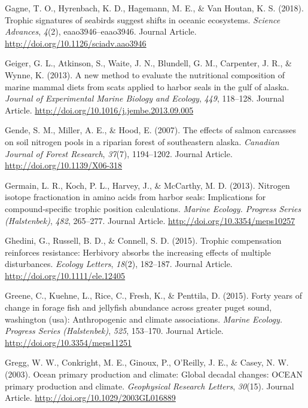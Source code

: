 \documentclass [11pt, proquest] {uwthesis}[2015/03/03]
\begin{document}
\hypertarget{ref-Gagne2018}{}
Gagne, T. O., Hyrenbach, K. D., Hagemann, M. E., \& Van Houtan, K. S.
(2018). Trophic signatures of seabirds suggest shifts in oceanic
ecosystems. \emph{Science Advances}, \emph{4}(2), eaao3946--eaao3946.
Journal Article. \url{http://doi.org/10.1126/sciadv.aao3946}

\hypertarget{ref-Geiger2013}{}
Geiger, G. L., Atkinson, S., Waite, J. N., Blundell, G. M., Carpenter,
J. R., \& Wynne, K. (2013). A new method to evaluate the nutritional
composition of marine mammal diets from scats applied to harbor seals in
the gulf of alaska. \emph{Journal of Experimental Marine Biology and
Ecology}, \emph{449}, 118--128. Journal Article.
\url{http://doi.org/10.1016/j.jembe.2013.09.005}

\hypertarget{ref-Gende2007}{}
Gende, S. M., Miller, A. E., \& Hood, E. (2007). The effects of salmon
carcasses on soil nitrogen pools in a riparian forest of southeastern
alaska. \emph{Canadian Journal of Forest Research}, \emph{37}(7),
1194--1202. Journal Article. \url{http://doi.org/10.1139/X06-318}

\hypertarget{ref-Germain2013}{}
Germain, L. R., Koch, P. L., Harvey, J., \& McCarthy, M. D. (2013).
Nitrogen isotope fractionation in amino acids from harbor seals:
Implications for compound-specific trophic position calculations.
\emph{Marine Ecology. Progress Series (Halstenbek)}, \emph{482},
265--277. Journal Article. \url{http://doi.org/10.3354/meps10257}

\hypertarget{ref-Ghedini2015}{}
Ghedini, G., Russell, B. D., \& Connell, S. D. (2015). Trophic
compensation reinforces resistance: Herbivory absorbs the increasing
effects of multiple disturbances. \emph{Ecology Letters}, \emph{18}(2),
182--187. Journal Article. \url{http://doi.org/10.1111/ele.12405}

\hypertarget{ref-Greene2015}{}
Greene, C., Kuehne, L., Rice, C., Fresh, K., \& Penttila, D. (2015).
Forty years of change in forage fish and jellyfish abundance across
greater puget sound, washington (usa): Anthropogenic and climate
associations. \emph{Marine Ecology. Progress Series (Halstenbek)},
\emph{525}, 153--170. Journal Article.
\url{http://doi.org/10.3354/meps11251}

\hypertarget{ref-Gregg2003}{}
Gregg, W. W., Conkright, M. E., Ginoux, P., O'Reilly, J. E., \& Casey,
N. W. (2003). Ocean primary production and climate: Global decadal
changes: OCEAN primary production and climate. \emph{Geophysical
Research Letters}, \emph{30}(15). Journal Article.
\url{http://doi.org/10.1029/2003GL016889}
\end{document}
